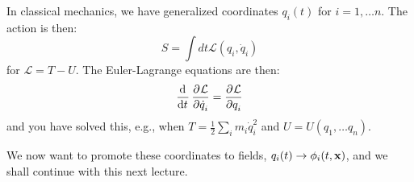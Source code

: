In classical mechanics, we have generalized coordinates $q_i(t)$ for $i = 1, \ldots n$. The action is then:
\begin{equation}
    S = \int dt \mathcal{L}(q_i, \dot{q}_i)
\end{equation}
for $\mathcal{L} = T - U$. The Euler-Lagrange equations are then:
\begin{equation}
    \dod{}{t}\dpd{\LL}{\dot{q}_i} = \dpd{\LL}{q_i}
\end{equation}
and you have solved this, e.g., when $T = \frac{1}{2}\sum_i m_i \dot{q}_i^2$ and $U = U(q_1, \ldots q_n)$. 

We now want to promote these coordinates to fields, $q_i(t) \to \phi_i(t, \mathbf{x})$, and we shall continue with this next lecture.